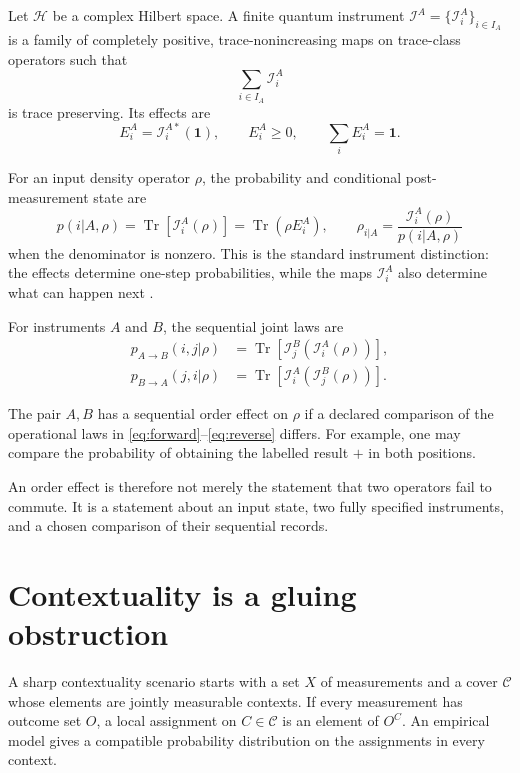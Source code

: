 \documentclass[11pt]{article}
\newcommand{\Tr}{\operatorname{Tr}}
\newcommand{\id}{\mathbf{1}}
\newcommand{\cI}{\mathcal{I}}
\newcommand{\cC}{\mathcal{C}}
\newcommand{\cH}{\mathcal{H}}
\begin{document}
\begin{definition}
Let \(\cH\) be a complex Hilbert space. A finite quantum instrument
\(\cI^A=\{\cI_i^A\}_{i\in I_A}\) is a family of completely positive,
trace-nonincreasing maps on trace-class operators such that
\[
\sum_{i\in I_A}\cI_i^A
\]
is trace preserving. Its effects are
\[
E_i^A=\cI_i^{A*}(\id),\qquad
E_i^A\geq0,\qquad
\sum_i E_i^A=\id .
\]
\end{definition}

For an input density operator \(\rho\), the probability and conditional
post-measurement state are
\begin{equation}
p(i|A,\rho)=\Tr\!\left[\cI_i^A(\rho)\right]
            =\Tr(\rho E_i^A),
\qquad
\rho_{i|A}=
\frac{\cI_i^A(\rho)}{p(i|A,\rho)}
\label{eq:instrument}
\end{equation}
when the denominator is nonzero. This is the standard instrument distinction:
the effects determine one-step probabilities, while the maps
\(\cI_i^A\) also determine what can happen next
\cite{DaviesLewis1970}.

For instruments \(A\) and \(B\), the sequential joint laws are
\begin{align}
p_{A\rightarrow B}(i,j|\rho)
 &=\Tr\!\left[\cI_j^B\!\left(\cI_i^A(\rho)\right)\right],
\label{eq:forward}\\
p_{B\rightarrow A}(j,i|\rho)
 &=\Tr\!\left[\cI_i^A\!\left(\cI_j^B(\rho)\right)\right].
\label{eq:reverse}
\end{align}

\begin{definition}
The pair \(A,B\) has a sequential order effect on \(\rho\) if a declared
comparison of the operational laws in
\eqref{eq:forward}--\eqref{eq:reverse} differs. For example, one may compare
the probability of obtaining the labelled result \(+\) in both positions.
\end{definition}

An order effect is therefore not merely the statement that two operators fail
to commute. It is a statement about an input state, two fully specified
instruments, and a chosen comparison of their sequential records.

\section{Contextuality is a gluing obstruction}

A sharp contextuality scenario starts with a set \(X\) of measurements and a
cover \(\cC\) whose elements are jointly measurable contexts. If every
measurement has outcome set \(O\), a local assignment on
\(C\in\cC\) is an element of \(O^C\). An empirical model gives a compatible
probability distribution on the assignments in every context.
\end{document}
